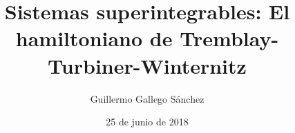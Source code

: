 \documentclass[aspectratio=169,mathserif]{beamer}
\title{Sistemas superintegrables: El hamiltoniano de Tremblay-Turbiner-Winternitz}
\author{Guillermo Gallego Sánchez}
\institute{Departamento de Física Teórica}
\date{25 de junio de 2018}
\newcommand{\vect}[1]{\mathbf{#1}}
\begin{document}
\begin{frame}
  \maketitle
\end{frame}



\end{document}
